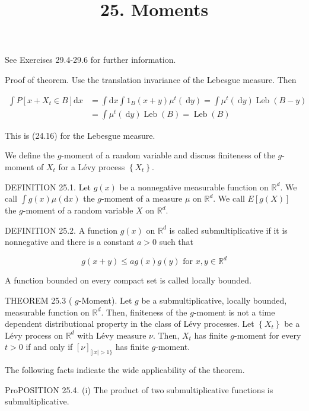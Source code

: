 \documentclass[a4paper,12pt]{article}
\title{25. Moments }
\author{}
\date{}
\begin{document}
\maketitle
See Exercises 29.4-29.6 for further information.

Proof of theorem. Use the translation invariance of the Lebesgue measure. Then

$$
    \begin{aligned}
        \int P\left[x+X_{t} \in B\right] \mathrm{d} x & =\int \mathrm{d} x \int 1_{B}(x+y) \mu^{t}(\mathrm{~d} y)=\int \mu^{t}(\mathrm{~d} y) \operatorname{Leb}(B-y) \\
                                                      & =\int \mu^{t}(\mathrm{~d} y) \operatorname{Leb}(B)=\operatorname{Leb}(B)
    \end{aligned}
$$

This is (24.16) for the Lebesgue measure.

We define the $g$-moment of a random variable and discuss finiteness of the $g$-moment of $X_{t}$ for a Lévy process $\left\{X_{t}\right\}$.

DEFINITION 25.1. Let $g(x)$ be a nonnegative measurable function on $\mathbb{R}^{d}$. We call $\int g(x) \mu(\mathrm{d} x)$ the $g$-moment of a measure $\mu$ on $\mathbb{R}^{d}$. We call $E[g(X)]$ the $g$-moment of a random variable $X$ on $\mathbb{R}^{d}$.

DEFINITION 25.2. A function $g(x)$ on $\mathbb{R}^{d}$ is called submultiplicative if it is nonnegative and there is a constant $a>0$ such that


\begin{equation*}
    g(x+y) \leq a g(x) g(y) \text { for } x, y \in \mathbb{R}^{d} \tag{25.1}
\end{equation*}


A function bounded on every compact set is called locally bounded.

THEOREM 25.3 ( $g$-Moment). Let $g$ be a submultiplicative, locally bounded, measurable function on $\mathbb{R}^{d}$. Then, finiteness of the $g$-moment is not a time dependent distributional property in the class of Lévy processes. Let $\left\{X_{t}\right\}$ be a Lévy process on $\mathbb{R}^{d}$ with Lévy measure $\nu$. Then, $X_{t}$ has finite $g$-moment for every $t>0$ if and only if $[\nu]_{[|x|>1\}}$ has finite $g$-moment.

                The following facts indicate the wide applicability of the theorem.

                ProPOSITION 25.4. (i) The product of two submultiplicative functions is submultiplicative.
\end{document}
